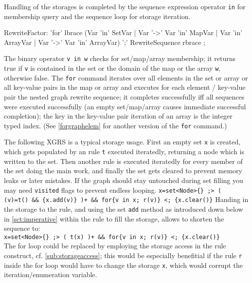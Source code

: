 \noindent Handling of the storages is completed by the sequence expression operator \texttt{in} for membership query and the sequence loop for storage iteration.

\begin{rail}
  RewriteFactor:
    'for' lbrace (Var 'in' SetVar | Var '->' Var 'in' MapVar | Var 'in' ArrayVar | Var '->' Var 'in' ArrayVar) ';' RewriteSequence rbrace
    ;
\end{rail}\label{forstorage}

The binary operator \texttt{v in w} checks for set/map/array membership; it returns true if \texttt{v} is contained in the set or the domain of the map or the array \texttt{w}, otherwise false.
The \texttt{for} command iterates over all elements in the set or array or all key-value pairs in the map or array and executes for each element / key-value pair the nested graph rewrite sequence; it completes successfully iff all sequences were executed successfully (an empty set/map/array causes immediate successful completion); the key in the key-value pair iteration of an array is the integer typed index. (See \ref{forgraphelem} for another version of the \texttt{for} command.)

\begin{example}
The following XGRS is a typical storage usage.
First an empty set \texttt{x} is created, which gets populated by an rule \texttt{t} executed iteratedly, returning a node which is written to the set.
Then another rule is executed iteratedly for every member of the set doing the main work, and finally the set gets cleared to prevent memory leaks or later mistakes.
If the graph should stay untouched during set filling you may need \texttt{visited} flags to prevent endless looping.
\verb#x=set<Node>{} ;> ( (v)=t() && {x.add(v)} )+ && for{v in x; r(v)} <; {x.clear()}#
Handing in the storage to the rule, and using the set \texttt{add} method as introduced down below in \ref{sct:imperative} within the rule to fill the storage, allows to shorten the sequence to:\\
\verb#x=set<Node>{} ;> ( t(x) )+ && for{v in x; r(v)} <; {x.clear()}#\\
The for loop could be replaced by employing the storage access in the rule construct, cf. \ref{sub:storageaccess}; this would be especially benefitial if the rule \texttt{r} inside the for loop would have to change the storage \texttt{x}, which would corrupt the iteration/enumeration variable.
\end{example}

